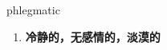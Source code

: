 
\begin{frame}
{\huge phlegmatic}
\begin{center}
\begin{enumerate}\Large
  \item \textbf{冷静的，无感情的，淡漠的}
\end{enumerate}
\end{center}
\end{frame}
